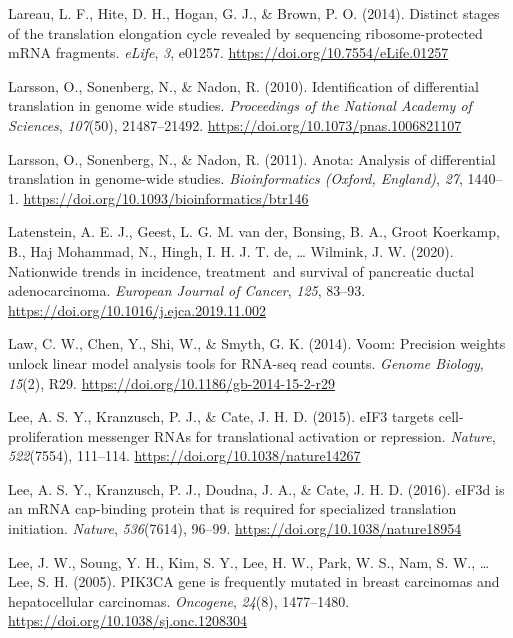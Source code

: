 \documentclass[12pt,openany]{book}
\begin{document}
\hypertarget{ref-Lareau2014}{}
Lareau, L. F., Hite, D. H., Hogan, G. J., \& Brown, P. O. (2014).
Distinct stages of the translation elongation cycle revealed by
sequencing ribosome-protected mRNA fragments. \emph{eLife}, \emph{3},
e01257. \url{https://doi.org/10.7554/eLife.01257}

\hypertarget{ref-Larsson2010}{}
Larsson, O., Sonenberg, N., \& Nadon, R. (2010). Identification of
differential translation in genome wide studies. \emph{Proceedings of
the National Academy of Sciences}, \emph{107}(50), 21487--21492.
\url{https://doi.org/10.1073/pnas.1006821107}

\hypertarget{ref-Larsson2011}{}
Larsson, O., Sonenberg, N., \& Nadon, R. (2011). Anota: Analysis of
differential translation in genome-wide studies. \emph{Bioinformatics
(Oxford, England)}, \emph{27}, 1440--1.
\url{https://doi.org/10.1093/bioinformatics/btr146}

\hypertarget{ref-Latenstein2020}{}
Latenstein, A. E. J., Geest, L. G. M. van der, Bonsing, B. A., Groot
Koerkamp, B., Haj Mohammad, N., Hingh, I. H. J. T. de, \ldots{} Wilmink,
J. W. (2020). Nationwide trends in incidence, treatment~and survival of
pancreatic ductal adenocarcinoma. \emph{European Journal of Cancer},
\emph{125}, 83--93. \url{https://doi.org/10.1016/j.ejca.2019.11.002}

\hypertarget{ref-Law2014}{}
Law, C. W., Chen, Y., Shi, W., \& Smyth, G. K. (2014). Voom: Precision
weights unlock linear model analysis tools for RNA-seq read counts.
\emph{Genome Biology}, \emph{15}(2), R29.
\url{https://doi.org/10.1186/gb-2014-15-2-r29}

\hypertarget{ref-Lee2015}{}
Lee, A. S. Y., Kranzusch, P. J., \& Cate, J. H. D. (2015). eIF3 targets
cell-proliferation messenger RNAs for translational activation or
repression. \emph{Nature}, \emph{522}(7554), 111--114.
\url{https://doi.org/10.1038/nature14267}

\hypertarget{ref-Lee2016}{}
Lee, A. S. Y., Kranzusch, P. J., Doudna, J. A., \& Cate, J. H. D.
(2016). eIF3d is an mRNA cap-binding protein that is required for
specialized translation initiation. \emph{Nature}, \emph{536}(7614),
96--99. \url{https://doi.org/10.1038/nature18954}

\hypertarget{ref-Lee2005}{}
Lee, J. W., Soung, Y. H., Kim, S. Y., Lee, H. W., Park, W. S., Nam, S.
W., \ldots{} Lee, S. H. (2005). PIK3CA gene is frequently mutated in
breast carcinomas and hepatocellular carcinomas. \emph{Oncogene},
\emph{24}(8), 1477--1480. \url{https://doi.org/10.1038/sj.onc.1208304}
\end{document}
